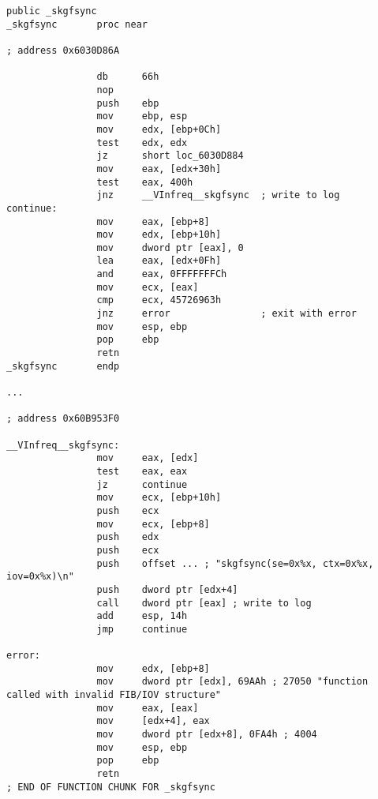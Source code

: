 \begin{lstlisting}[caption=orageneric11.dll (win32)]
                public _skgfsync
_skgfsync       proc near

; address 0x6030D86A

                db      66h
                nop
                push    ebp
                mov     ebp, esp
                mov     edx, [ebp+0Ch]
                test    edx, edx
                jz      short loc_6030D884
                mov     eax, [edx+30h]
                test    eax, 400h
                jnz     __VInfreq__skgfsync  ; write to log
continue:
                mov     eax, [ebp+8]
                mov     edx, [ebp+10h]
                mov     dword ptr [eax], 0
                lea     eax, [edx+0Fh]
                and     eax, 0FFFFFFFCh
                mov     ecx, [eax]
                cmp     ecx, 45726963h
                jnz     error                ; exit with error
                mov     esp, ebp
                pop     ebp
                retn
_skgfsync       endp

...

; address 0x60B953F0

__VInfreq__skgfsync:
                mov     eax, [edx]
                test    eax, eax
                jz      continue
                mov     ecx, [ebp+10h]
                push    ecx
                mov     ecx, [ebp+8]
                push    edx
                push    ecx
                push    offset ... ; "skgfsync(se=0x%x, ctx=0x%x, iov=0x%x)\n"
                push    dword ptr [edx+4]
                call    dword ptr [eax] ; write to log
                add     esp, 14h
                jmp     continue

error:
                mov     edx, [ebp+8]
                mov     dword ptr [edx], 69AAh ; 27050 "function called with invalid FIB/IOV structure"
                mov     eax, [eax]
                mov     [edx+4], eax
                mov     dword ptr [edx+8], 0FA4h ; 4004
                mov     esp, ebp
                pop     ebp
                retn
; END OF FUNCTION CHUNK FOR _skgfsync
\end{lstlisting}


